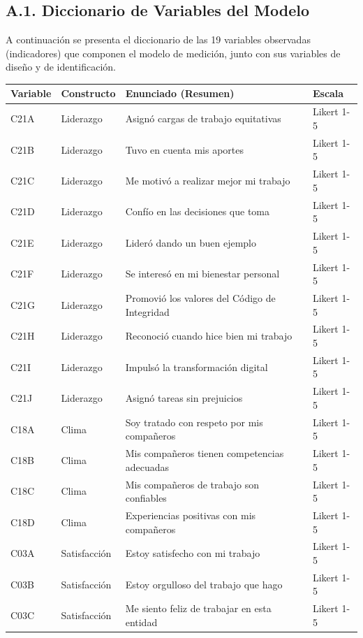 \documentclass[11pt, a4paper]{article} %
\begin{document}
\subsection*{A.1. Diccionario de Variables del Modelo}
A continuación se presenta el diccionario de las 19 variables observadas (indicadores) que componen el modelo de medición, junto con sus variables de diseño y de identificación.

\begin{table}[H]
\centering
\footnotesize
\begin{tabularx}{\textwidth}{l l X l}
\toprule
\textbf{Variable} & \textbf{Constructo} & \textbf{Enunciado (Resumen)} & \textbf{Escala} \\
\midrule
C21A & Liderazgo & Asignó cargas de trabajo equitativas & Likert 1-5 \\
C21B & Liderazgo & Tuvo en cuenta mis aportes & Likert 1-5 \\
C21C & Liderazgo & Me motivó a realizar mejor mi trabajo & Likert 1-5 \\
C21D & Liderazgo & Confío en las decisiones que toma & Likert 1-5 \\
C21E & Liderazgo & Lideró dando un buen ejemplo & Likert 1-5 \\
C21F & Liderazgo & Se interesó en mi bienestar personal & Likert 1-5 \\
C21G & Liderazgo & Promovió los valores del Código de Integridad & Likert 1-5 \\
C21H & Liderazgo & Reconoció cuando hice bien mi trabajo & Likert 1-5 \\
C21I & Liderazgo & Impulsó la transformación digital & Likert 1-5 \\
C21J & Liderazgo & Asignó tareas sin prejuicios & Likert 1-5 \\
\midrule
C18A & Clima & Soy tratado con respeto por mis compañeros & Likert 1-5 \\
C18B & Clima & Mis compañeros tienen competencias adecuadas & Likert 1-5 \\
C18C & Clima & Mis compañeros de trabajo son confiables & Likert 1-5 \\
C18D & Clima & Experiencias positivas con mis compañeros & Likert 1-5 \\
\midrule
C03A & Satisfacción & Estoy satisfecho con mi trabajo & Likert 1-5 \\
C03B & Satisfacción & Estoy orgulloso del trabajo que hago & Likert 1-5 \\
C03C & Satisfacción & Me siento feliz de trabajar en esta entidad & Likert 1-5 \\

\end{tabularx}
\end{table}
\end{document}
